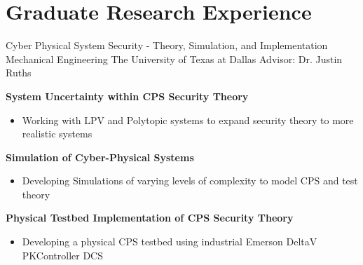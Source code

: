 \section{Graduate Research Experience}

{Cyber Physical System Security - Theory, Simulation, and Implementation}
{Mechanical Engineering}
{The University of Texas at Dallas}
{Advisor: Dr. Justin Ruths}
{
\textbf{System Uncertainty within CPS Security Theory}
\begin{itemize}
    \item Working with LPV and Polytopic systems to expand security theory to more realistic systems
\end{itemize}
\textbf{Simulation of Cyber-Physical Systems}
\begin{itemize}
    \item Developing Simulations of varying levels of complexity to model CPS and test theory
\end{itemize}
\textbf{Physical Testbed Implementation of CPS Security Theory}
\begin{itemize}
    \item Developing a physical CPS testbed using industrial Emerson DeltaV PKController DCS
\end{itemize}
}